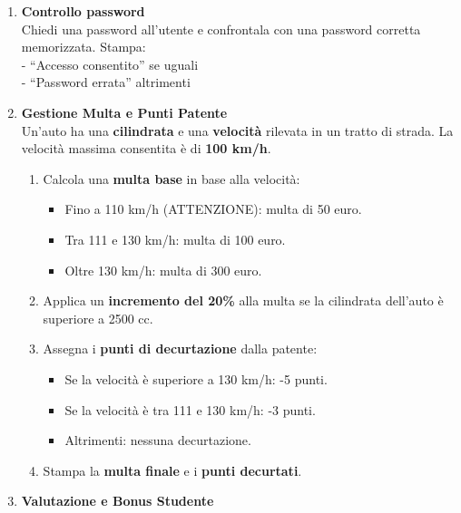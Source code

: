 \documentclass{article}
\begin{document}
\begin{enumerate}
    \item \textbf{Controllo password} \\
    Chiedi una password all'utente e confrontala con una password corretta memorizzata. Stampa: \\
    \quad - ``Accesso consentito'' se uguali \\
    \quad - ``Password errata'' altrimenti
    
    \item \textbf{Gestione Multa e Punti Patente} \\
    Un'auto ha una \textbf{cilindrata} e una \textbf{velocità} rilevata in un tratto di strada. La velocità massima consentita è di \textbf{100 km/h}.

    \begin{enumerate}
        \item Calcola una \textbf{multa base} in base alla velocità:
        \begin{itemize}
            \item Fino a 110 km/h (ATTENZIONE): multa di 50 euro.
            \item Tra 111 e 130 km/h: multa di 100 euro.
            \item Oltre 130 km/h: multa di 300 euro.
        \end{itemize}
        
        \item Applica un \textbf{incremento del 20\%} alla multa se la cilindrata dell'auto è superiore a 2500 cc.
        
        \item Assegna i \textbf{punti di decurtazione} dalla patente:
        \begin{itemize}
            \item Se la velocità è superiore a 130 km/h: -5 punti.
            \item Se la velocità è tra 111 e 130 km/h: -3 punti.
            \item Altrimenti: nessuna decurtazione.
        \end{itemize}
        
        \item Stampa la \textbf{multa finale} e i \textbf{punti decurtati}.
    \end{enumerate}

    \vspace{0.5cm}

    \item \textbf{Valutazione e Bonus Studente} \\


\end{enumerate}
\end{document}

